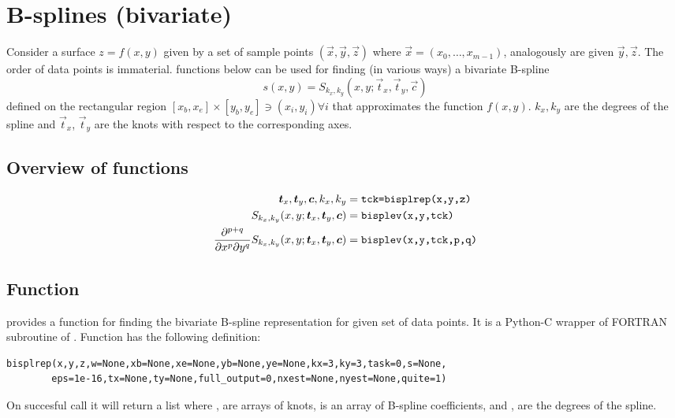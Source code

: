 \section{B-splines (bivariate)}
\label{sec:fitpack2}

Consider a surface $z=f(x,y)$ given by a set of sample points $(\vec
x,\vec y,\vec z)$ where $\vec x=(x_0,\ldots,x_{m-1})$, analogously are
given $\vec y, \vec z$. The order of data points is immaterial.
 functions below can be used for finding (in various
ways) a bivariate B-spline
\begin{displaymath}
  s(x,y)=S_{k_x,k_y}(x,y;\vec t_x,\vec t_y,\vec c)
\end{displaymath}
defined on the rectangular region $[x_b,x_e]\times[y_b,y_e]\ni
(x_i,y_i)\forall i$ that approximates the function $f(x,y)$.
$k_x,k_y$ are the degrees of the spline and $\vec t_x$, $\vec t_y$ are
the knots with respect to the corresponding axes.

\subsection{Overview of functions}
\label{sec:fitpack2_short}

\newcommand{\Skxy}{S_{k_x,k_y}(x,y;\vec t_x,\vec t_y,\vec c)}
\begin{displaymath}
  \begin{split}
    \vec t_x, \vec t_y, \vec c, k_x, k_y &=
    \text{\code{tck=bisplrep(x,y,z)}}\\
    \Skxy &= \text{\code{bisplev(x,y,tck)}}\\
    \nmuxy pq{}xy\Skxy &= \text{\code{bisplev(x,y,tck,p,q)}}
  \end{split}
\end{displaymath}

\subsection{Function }
\label{sec:bisplrep}


 provides a function  for finding the
bivariate B-spline representation for given set of data points.  It is
a Python-C wrapper of FORTRAN subroutine  of
.  Function  has the following definition:
\begin{verbatim}
bisplrep(x,y,z,w=None,xb=None,xe=None,yb=None,ye=None,kx=3,ky=3,task=0,s=None,
        eps=1e-16,tx=None,ty=None,full_output=0,nxest=None,nyest=None,quite=1)
\end{verbatim}
On succesful call it will return a list \code{[tx,ty,c,kx,ky]} where
,  are arrays of knots,  is an array of
B-spline coefficients, and ,  are the degrees of the
spline.

